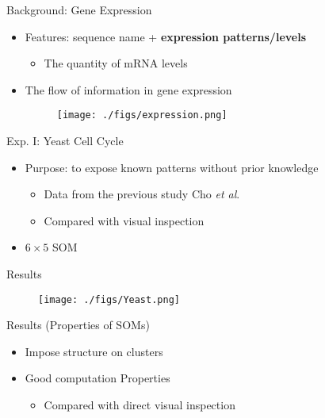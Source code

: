 \begin{frame}{Background: Gene Expression}
    \begin{itemize}
        \item Features: sequence name + \textbf{expression patterns/levels} 
              \begin{itemize}
                  \item The quantity of mRNA levels
              \end{itemize}
        \item The flow of information in gene expression
              \begin{figure}
                  \centering
                  \texttt{[image: ./figs/expression.png]}
              \end{figure}
    \end{itemize}
\end{frame}

\begin{frame}{Exp. I: Yeast Cell Cycle}
    \begin{itemize}
        \item Purpose: to expose known patterns without prior knowledge
              \begin{itemize}
                  \item Data from the previous study Cho \emph{et al}.
                  \item Compared with visual inspection
              \end{itemize}
        \item $6\times 5$ SOM
    \end{itemize}
\end{frame}

\begin{frame}{Results}
    \begin{figure}
        \centering
        \texttt{[image: ./figs/Yeast.png]}
    \end{figure}
\end{frame}

\begin{frame}{Results (Properties of SOMs)}
    \begin{itemize}
        \item Impose structure on clusters
        \item Good computation Properties
        \begin{itemize}
            \item Compared with direct visual inspection
        \end{itemize}
    \end{itemize}
\end{frame}

